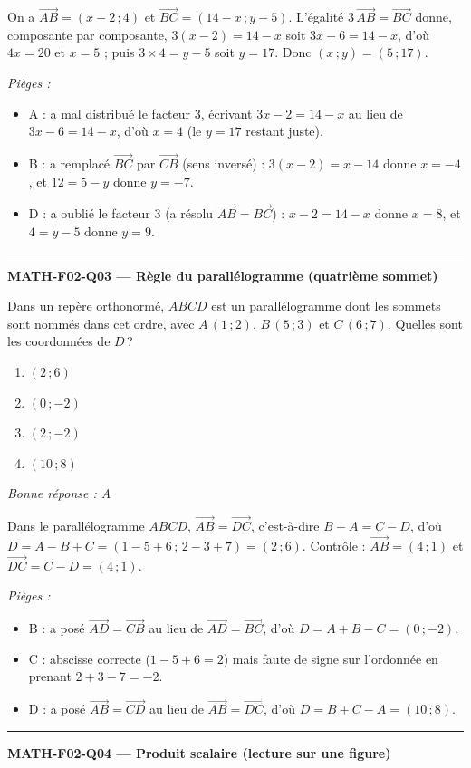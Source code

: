 \documentclass[11pt,a4paper]{article}
\newcommand{\vv}[1]{\vec{#1}}
\begin{document}
On a $\vv{AB}=(x-2\,;4)$ et $\vv{BC}=(14-x\,;y-5)$. L'égalité $3\,\vv{AB}=\vv{BC}$ donne, composante par composante, $3(x-2)=14-x$ soit $3x-6=14-x$, d'où $4x=20$ et $x=5$ ; puis $3\times 4=y-5$ soit $y=17$. Donc $(x\,;y)=(5\,;17)$.\par
\textit{Pièges :}
\begin{itemize}
\item A : a mal distribué le facteur $3$, écrivant $3x-2=14-x$ au lieu de $3x-6=14-x$, d'où $x=4$ (le $y=17$ restant juste).
\item B : a remplacé $\vv{BC}$ par $\vv{CB}$ (sens inversé) : $3(x-2)=x-14$ donne $x=-4$, et $12=5-y$ donne $y=-7$.
\item D : a oublié le facteur $3$ (a résolu $\vv{AB}=\vv{BC}$) : $x-2=14-x$ donne $x=8$, et $4=y-5$ donne $y=9$.
\end{itemize}
\vspace{8pt}\hrule\vspace{8pt}
\noindent\textbf{MATH-F02-Q03 --- Règle du parallélogramme (quatrième sommet)}\par
Dans un repère orthonormé, $ABCD$ est un parallélogramme dont les sommets sont nommés dans cet ordre, avec $A\,(1\,;2)$, $B\,(5\,;3)$ et $C\,(6\,;7)$. Quelles sont les coordonnées de $D$\,?
\begin{enumerate}[label=\Alph*)]
\item $(2\,;6)$
\item $(0\,;-2)$
\item $(2\,;-2)$
\item $(10\,;8)$
\end{enumerate}
\textit{Bonne réponse : A}\par
Dans le parallélogramme $ABCD$, $\vv{AB}=\vv{DC}$, c'est-à-dire $B-A=C-D$, d'où $D=A-B+C=(1-5+6\,;\,2-3+7)=(2\,;6)$. Contrôle : $\vv{AB}=(4\,;1)$ et $\vv{DC}=C-D=(4\,;1)$.\par
\textit{Pièges :}
\begin{itemize}
\item B : a posé $\vv{AD}=\vv{CB}$ au lieu de $\vv{AD}=\vv{BC}$, d'où $D=A+B-C=(0\,;-2)$.
\item C : abscisse correcte ($1-5+6=2$) mais faute de signe sur l'ordonnée en prenant $2+3-7=-2$.
\item D : a posé $\vv{AB}=\vv{CD}$ au lieu de $\vv{AB}=\vv{DC}$, d'où $D=B+C-A=(10\,;8)$.
\end{itemize}
\vspace{8pt}\hrule\vspace{8pt}
\noindent\textbf{MATH-F02-Q04 --- Produit scalaire (lecture sur une figure)}\par
\end{document}
